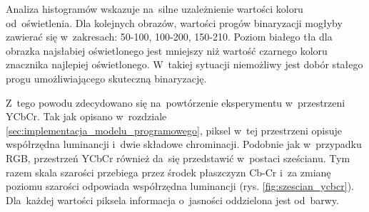 Analiza histogramów wskazuje na~silne uzależnienie wartości koloru od~oświetlenia.  %
Dla kolejnych obrazów, wartości progów binaryzacji mogłyby zawierać się w~zakresach: 50-100, 100-200, 150-210. Poziom białego tła dla obrazka najsłabiej oświetlonego jest mniejszy niż wartość czarnego koloru znacznika najlepiej oświetlonego. 
W~takiej sytuacji niemożliwy jest dobór stałego progu umożliwiającego skuteczną binaryzację.

Z~tego powodu zdecydowano się na~powtórzenie eksperymentu w~przestrzeni YCbCr. 
Tak jak opisano w~rozdziale \ref{sec:implementacja_modelu_programowego}, piksel w~tej przestrzeni opisuje współrzędna luminancji i~dwie składowe chrominacji. 
Podobnie jak w~przypadku RGB, przestrzeń YCbCr również da~się przedstawić w~postaci sześcianu. 
Tym razem skala szarości przebiega przez środek płaszczyzn Cb-Cr i~za zmianę poziomu szarości odpowiada współrzędna luminancji (rys. \ref{fig:szescian_ycbcr}). 
Dla~każdej wartości piksela informacja o~jasności oddzielona jest od~barwy.

